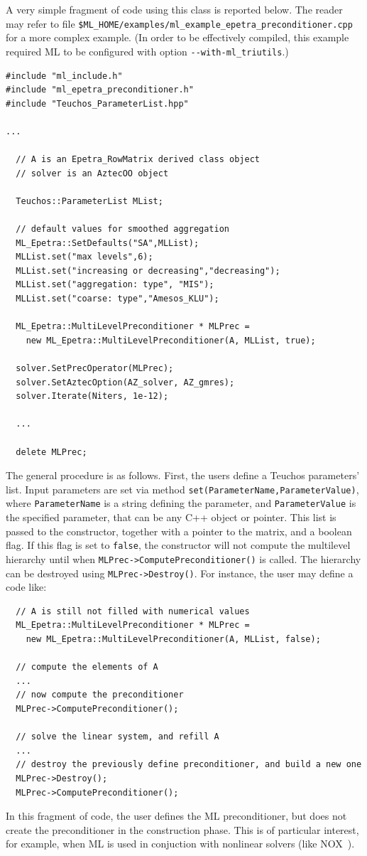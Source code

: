 A very simple fragment of code using this class is reported below. The
reader may refer to file
\verb!$ML_HOME/examples/ml_example_epetra_preconditioner.cpp! for a more
complex example. (In order to be effectively compiled, this example
required ML to be configured with option \verb!--with-ml_triutils!.)
\begin{verbatim}
#include "ml_include.h"
#include "ml_epetra_preconditioner.h"
#include "Teuchos_ParameterList.hpp"

...

  // A is an Epetra_RowMatrix derived class object
  // solver is an AztecOO object

  Teuchos::ParameterList MList;

  // default values for smoothed aggregation
  ML_Epetra::SetDefaults("SA",MLList);
  MLList.set("max levels",6);
  MLList.set("increasing or decreasing","decreasing");
  MLList.set("aggregation: type", "MIS");
  MLList.set("coarse: type","Amesos_KLU");
  
  ML_Epetra::MultiLevelPreconditioner * MLPrec = 
    new ML_Epetra::MultiLevelPreconditioner(A, MLList, true);

  solver.SetPrecOperator(MLPrec);
  solver.SetAztecOption(AZ_solver, AZ_gmres);
  solver.Iterate(Niters, 1e-12);

  ...

  delete MLPrec;
\end{verbatim}
The general procedure is as follows. First, the users define a Teuchos
parameters' list. Input parameters are set via method
\verb!set(ParameterName,ParameterValue)!, where \verb!ParameterName! is
a string defining the parameter, and \verb!ParameterValue! is the
specified parameter, that can be any C++ object or pointer.  This list
is passed to the constructor, together with a pointer to the matrix, and
a boolean flag.  If this flag is set to \verb!false!, the constructor
will not compute the multilevel hierarchy until when
\verb!MLPrec->ComputePreconditioner()! is called. The hierarchy can be
destroyed using \verb!MLPrec->Destroy()!.  For instance, the user may
define a code like:
\begin{verbatim}
  // A is still not filled with numerical values
  ML_Epetra::MultiLevelPreconditioner * MLPrec = 
    new ML_Epetra::MultiLevelPreconditioner(A, MLList, false);
  
  // compute the elements of A
  ...
  // now compute the preconditioner
  MLPrec->ComputePreconditioner();

  // solve the linear system, and refill A
  ...
  // destroy the previously define preconditioner, and build a new one
  MLPrec->Destroy();
  MLPrec->ComputePreconditioner();
\end{verbatim}
In this fragment of code, the user defines the ML preconditioner, but
does not create the preconditioner in the construction phase. This is of
particular interest, for example, when ML is used in conjuction with
nonlinear solvers (like NOX~\cite{NOX-home-page}).

